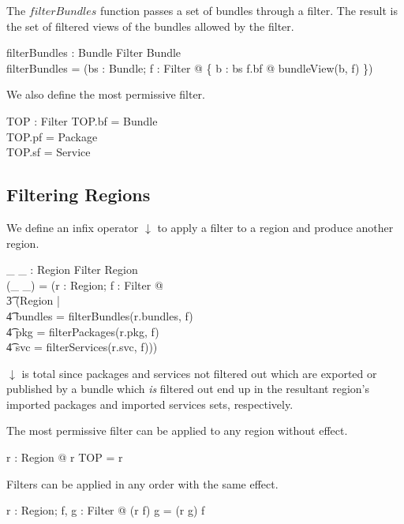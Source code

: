 \documentclass[a4paper,9pt]{article}
\begin{document}
The $filterBundles$ function passes a set of bundles through a filter.
The result is the set of filtered views of the bundles allowed by the filter.
\begin{axdef}
  filterBundles : \power Bundle \cross Filter \fun \power Bundle \\
\where
  filterBundles = (\lambda bs : \power Bundle; f : Filter @ \{ b : bs \cap f.bf @ bundleView(b, f) \}) \\
\end{axdef}

We also define the most permissive filter.
\begin{axdef}
  TOP : Filter
\where
  TOP.bf = Bundle \\
  TOP.pf = Package \\
  TOP.sf = Service \\
\end{axdef}

\subsection{Filtering Regions}

We define an infix operator $\downarrow$ to apply a filter to a region and produce another region.
\begin{axdef}
  \_ \downarrow \_ : Region \cross Filter \fun Region \\
\where
  (\_ \downarrow \_) = (\lambda r : Region;  f : Filter @ \\
\t3   (\mu Region | \\
\t4 bundles = filterBundles(r.bundles, f) \land \\
\t4 pkg = filterPackages(r.pkg, f) \land \\
\t4 svc = filterServices(r.svc, f))) \\
\end{axdef}
$\downarrow$ is total since packages and services not filtered out which are exported or published by a
bundle which \textit{is} filtered out end up
in the resultant region's imported packages and imported services sets, respectively.

The most permissive filter can be applied to any region without effect.
\begin{argue}
  \shows \forall r : Region @ r \downarrow TOP = r \\
\end{argue}

Filters can be applied in any order with the same effect.
\begin{argue}
  \shows \forall r : Region; f, g : Filter @ (r \downarrow f) \downarrow g = (r \downarrow g) \downarrow f \\
\end{argue}
\end{document}

